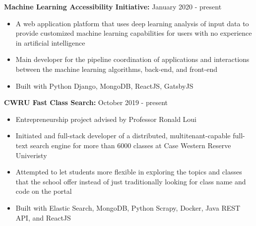 \documentclass[a4paper,11pt]{article}
\begin{document}
\begin{flushleft}
	
	\textbf{Machine Learning Accessibility Initiative:} January 2020 - present
	\vspace{-\topsep}
	\begin{itemize}
		\setlength{\itemsep}{0pt plus 1pt}
		\item A web application platform that uses deep learning analysis of input data to provide customized machine learning capabilities for users with no experience in artificial intelligence
		\item Main developer for the pipeline coordination of applications and interactions between the machine learning algorithms, back-end, and front-end
		\item Built with Python Django, MongoDB, ReactJS, GatsbyJS
	\end{itemize}
	
	
	\textbf{CWRU Fast Class Search:} October 2019 - present
	\vspace{-\topsep}
	\begin{itemize}
		\setlength{\itemsep}{0pt plus 1pt}
		\item Entrepreneurship project advised by Professor Ronald Loui
		\item Initiated and full-stack developer of a distributed, multitenant-capable full-text search engine for more than 6000 classes at Case Western Reserve Univeristy
		\item Attempted to let students more flexible in exploring the topics and classes that the school offer instead of just traditionally looking for class name and code on the portal
		\item Built with Elastic Search, MongoDB, Python Scrapy, Docker, Java REST API, and ReactJS
	\end{itemize}
	
	
\centering{\noindent\makebox{\rule{8cm}{1.5pt}}}
\end{flushleft}
\end{document}
